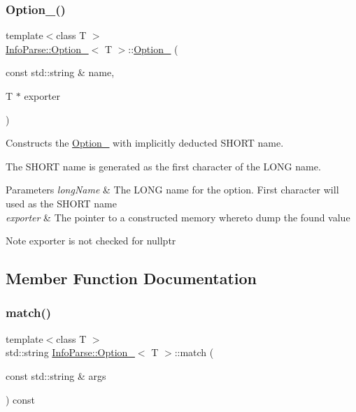\subsubsection{\texorpdfstring{Option\_()}{Option\_()}\hspace{0.1cm}{\footnotesize\ttfamily [2/2]}}
{\footnotesize\ttfamily template$<$class T $>$ \\
\mbox{\hyperlink{class_info_parse_1_1_option__}{Info\+Parse\+::\+Option\+\_\+}}$<$ T $>$\+::\mbox{\hyperlink{class_info_parse_1_1_option__}{Option\+\_\+}} (\begin{DoxyParamCaption}
                                                                                                                                                                \item[{const std\+::string \&}]{name,  }\item[{T $\ast$}]{exporter }
\end{DoxyParamCaption})}



Constructs the \mbox{\hyperlink{class_info_parse_1_1_option__}{Option\+\_\+}} with implicitly deducted S\+H\+O\+RT name.

The S\+H\+O\+RT name is generated as the first character of the L\+O\+NG name.


\begin{DoxyParams}{Parameters}
{\em long\+Name}
    & The L\+O\+NG name for the option. First character will used as the S\+H\+O\+RT name \\
    \hline
    {\em exporter} & The pointer to a constructed memory whereto dump the found value\\
    \hline
\end{DoxyParams}
\begin{DoxyNote}{Note}
{\ttfamily exporter}
    is not checked for {\ttfamily nullptr}
\end{DoxyNote}


\subsection{Member Function Documentation}
\mbox{\label{class_info_parse_1_1_option___a3fc88712223eb85ad1bb16c89eb0f49a}}
\subsubsection{\texorpdfstring{match()}{match()}}
{\footnotesize\ttfamily template$<$class T $>$ \\
std\+::string \mbox{\hyperlink{class_info_parse_1_1_option__}{Info\+Parse\+::\+Option\+\_\+}}$<$ T $>$\+::match (\begin{DoxyParamCaption}
                                                                                                                     \item[{const std\+::string \&}]{args }
\end{DoxyParamCaption}) const}



